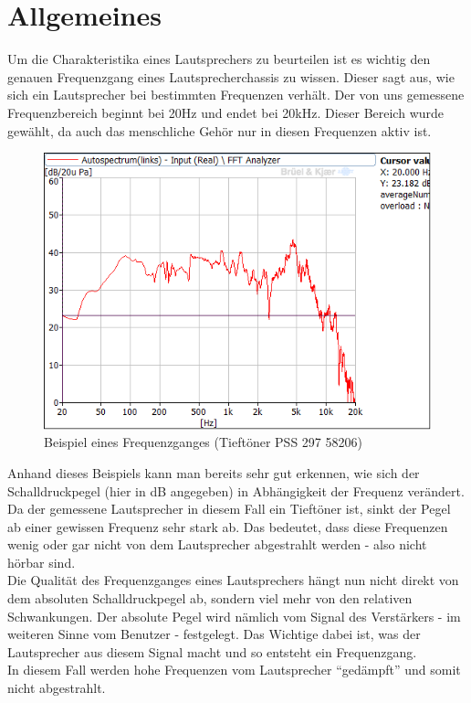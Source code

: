 \section{Allgemeines}\label{sec:5.1}
Um die Charakteristika eines Lautsprechers zu beurteilen ist es wichtig den genauen Frequenzgang eines Lautsprecherchassis zu wissen. Dieser sagt aus, wie sich ein Lautsprecher bei bestimmten Frequenzen verhält. Der von uns gemessene Frequenzbereich beginnt bei 20Hz und endet bei 20kHz. Dieser Bereich wurde gewählt, da auch das menschliche Gehör nur in diesen Frequenzen aktiv ist.
\begin{figure} [H]
	\centering
	\includegraphics[width=1\textwidth]{img/LSMessung/TT1_9,17l_bestes.png}
	\caption{Beispiel eines Frequenzganges (Tieftöner PSS 297 58206)}
	\label{fig:5.1.1}
\end{figure}
Anhand dieses Beispiels kann man bereits sehr gut erkennen, wie sich der Schalldruckpegel (hier in dB angegeben) in Abhängigkeit der Frequenz verändert.\newpage
Da der gemessene Lautsprecher in diesem Fall ein Tieftöner ist, sinkt der Pegel ab einer gewissen Frequenz sehr stark ab. Das bedeutet, dass diese Frequenzen wenig oder gar nicht von dem Lautsprecher abgestrahlt werden - also nicht hörbar sind.\\
Die Qualität des Frequenzganges eines Lautsprechers hängt nun nicht direkt von dem absoluten Schalldruckpegel ab, sondern viel mehr von den relativen Schwankungen. Der absolute Pegel wird nämlich vom Signal des Verstärkers - im weiteren Sinne vom Benutzer - festgelegt. Das Wichtige dabei ist, was der Lautsprecher aus diesem Signal macht und so entsteht ein Frequenzgang.\\
In diesem Fall werden hohe Frequenzen vom Lautsprecher \enquote{gedämpft} und somit nicht abgestrahlt.

